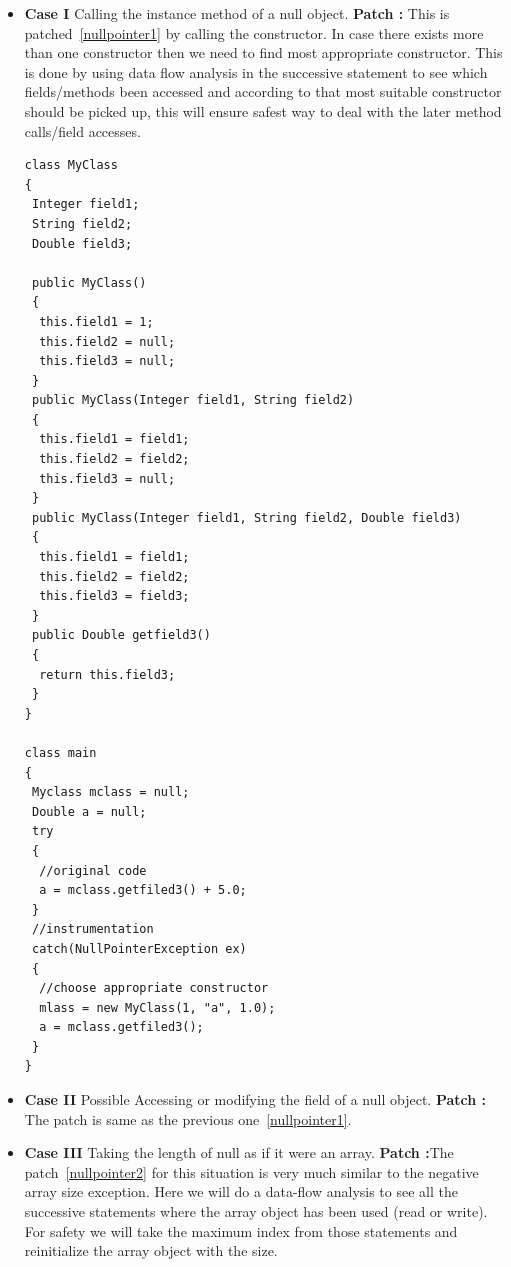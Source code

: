 \begin{itemize}
  \item \textbf{Case I} Calling the instance method of a null object. \newline
  \textbf{Patch :} This is patched~\ref{nullpointer1} by calling the
  constructor.
  In case there exists more than one constructor then we need to find most appropriate
  constructor. This is done by using data flow analysis in the successive
  statement to see which fields/methods been accessed and according to that
  most suitable constructor should be picked up, this will ensure safest way to
  deal with the later method calls/field accesses.
  

\onehalfspacing
\lstset{language=Java, caption=appropriate constructor, label=nullpointer1}

\begin{lstlisting}
class MyClass
{
 Integer field1;
 String field2;
 Double field3;

 public MyClass()
 {
  this.field1 = 1;
  this.field2 = null;
  this.field3 = null;
 } 
 public MyClass(Integer field1, String field2)
 {
  this.field1 = field1;
  this.field2 = field2;
  this.field3 = null;
 } 
 public MyClass(Integer field1, String field2, Double field3)
 {
  this.field1 = field1;
  this.field2 = field2;
  this.field3 = field3;
 }
 public Double getfield3()
 {
  return this.field3;
 }
}

class main
{
 Myclass mclass = null;
 Double a = null;
 try
 {
  //original code
  a = mclass.getfiled3() + 5.0;
 }
 //instrumentation
 catch(NullPointerException ex)
 {
  //choose appropriate constructor
  mlass = new MyClass(1, "a", 1.0); 
  a = mclass.getfiled3();
 }
}
\end{lstlisting}
 
 \doublespacing
  
  \item \textbf{Case II} Possible Accessing or modifying the field of a null
  object.\newline
  \textbf{Patch :} The patch is same as the previous one~\ref{nullpointer1}.
  
  \item \textbf{Case III} Taking the length of null as if it were an
  array.\newline
  \textbf{Patch :}The patch~\ref{nullpointer2} for this situation is very much
  similar to the negative array size exception. Here we will do a data-flow analysis to see all
  the successive statements where the array object has been used (read or
  write). For safety we will take the maximum index from those statements and
  reinitialize the array object with the size.



\end{itemize}
